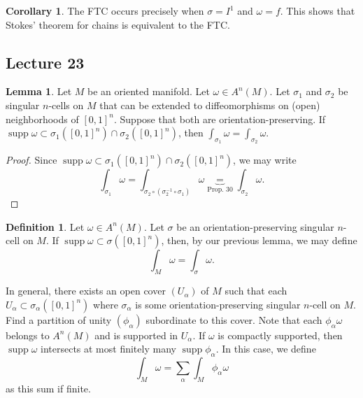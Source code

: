 \documentclass[10pt,letterpaper,cm]{nupset}
\theoremstyle{definition}
\newtheorem*{definition}{Definition}
\newtheorem{corollary}{Corollary}
\newtheorem{lemma}{Lemma}
\newcommand{\1}{\mathbf{1}}
\newcommand{\0}{\vec 0}
\DeclareMathOperator{\supp}{supp}
\begin{document}
\begin{corollary}
The FTC occurs precisely when $\sigma = I^1$ and $\omega = f$. This shows that Stokes' theorem for chains is equivalent to the FTC.
\end{corollary}

\subsection{Lecture 23}

\begin{lemma}
Let $M$ be an oriented manifold. Let $\omega \in A^n(M)$. Let $\sigma_1$ and $\sigma_2$ be singular $n$-cells on $M$ that can be extended to diffeomorphisms on (open) neighborhoods of $[0,1]^n$. Suppose that both are orientation-preserving. If $\supp \omega \subset  \sigma_1([0,1]^n) \cap \sigma_2([0,1]^n)$, then $\int_{\sigma_1} \omega = \int_{\sigma_2} \omega$.
\end{lemma}
\begin{proof}
Since $\supp \omega \subset  \sigma_1([0,1]^n) \cap \sigma_2([0,1]^n)$, we may write $$\int_{\sigma_1} \omega = \int_{\sigma_2 \circ (\sigma_2^{-1} \circ \sigma_1)} \omega  \underbrace{=}_{\text{Prop. 30}} \int_{\sigma_2} \omega     .$$
\end{proof}

\begin{definition}
Let $\omega \in A^n(M)$. Let $\sigma$ be an orientation-preserving singular $n$-cell on $M$. If $\supp \omega \subset \sigma([0,1]^n)$, then, by our previous lemma, we may define $$\int_M \omega = \int_{\sigma} \omega.$$

In general, there exists an open cover $(U_{\alpha})$ of $M$ such that each $U_{\alpha} \subset \sigma_{\alpha}([0,1]^n)$ where $\sigma_{\alpha}$ is some orientation-preserving singular $n$-cell on $M$. Find a partition of unity $(\phi_{\alpha})$ subordinate to this cover. Note that each $\phi_{\alpha} \omega$ belongs to  $A^n(M)$ and is supported in $U_{\alpha}$. If $\omega$ is compactly supported, then $\supp \omega$ intersects at most finitely many $\supp \phi_{\alpha}$. In this case, we define $$\int_M \omega = \sum_{\alpha}  \int_M \phi_{\alpha} \omega$$ as this sum if finite. 
\end{definition}
\end{document}
